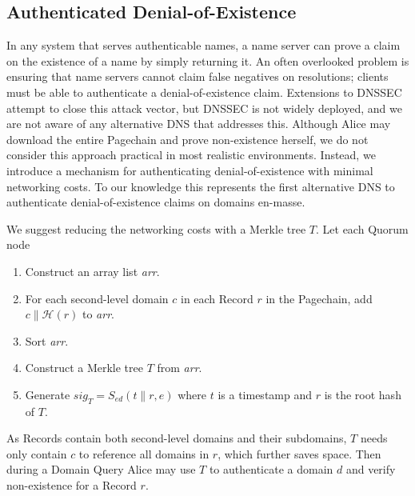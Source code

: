 \documentclass[conference]{IEEEtran}
\newcommand*\concat{\mathbin{\|}}
\begin{document}
\subsection{Authenticated Denial-of-Existence}
\label{sec:authDenial}

In any system that serves authenticable names, a name server can prove a claim on the existence of a name by simply returning it. An often overlooked problem is ensuring that name servers cannot claim false negatives on resolutions; clients must be able to authenticate a denial-of-existence claim. Extensions to DNSSEC attempt to close this attack vector, but DNSSEC is not widely deployed, and we are not aware of any alternative DNS that addresses this. Although Alice may download the entire Pagechain and prove non-existence herself, we do not consider this approach practical in most realistic environments. Instead, we introduce a mechanism for authenticating denial-of-existence with minimal networking costs. To our knowledge this represents the first alternative DNS to authenticate denial-of-existence claims on domains en-masse.

We suggest reducing the networking costs with a Merkle tree\cite{merkle1988digital} $ T $. Let each Quorum node

\begin{enumerate}
	\item Construct an array list \emph{arr}.
	\item For each second-level domain $ c $ in each Record $ r $ in the Pagechain, add $ c \concat \mathcal{H}(r) $ to \emph{arr}.
	\item Sort \emph{arr}.
	\item Construct a Merkle tree $ T $ from \emph{arr}.
	\item Generate $ \mathit{sig}_{T} = S_{\mathit{ed}}(t \concat r, e) $ where $ t $ is a timestamp and $ r $ is the root hash of $ T $.
\end{enumerate}

As Records contain both second-level domains and their subdomains, $ T $ needs only contain $ c $ to reference all domains in $ r $, which further saves space. Then during a Domain Query Alice may use $ T $ to authenticate a domain $ d $ and verify non-existence for a Record $ r $.
\end{document}
